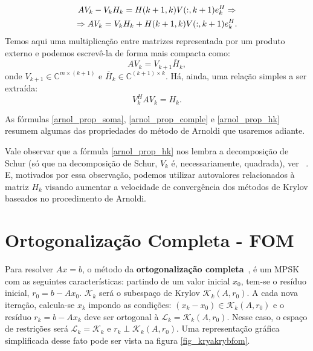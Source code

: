 \begin{gather}
AV_k-V_kH_k=H(k+1,k)V(:,k+1)e_k^H \Rightarrow \notag\\ \Rightarrow AV_k=V_kH_k+H(k+1,k)V(:,k+1)e_k^H\label{arnol_prop_soma}.
\end{gather}
Temos aqui uma multiplicação entre matrizes representada por um produto externo e podemos escrevê-la de forma mais compacta como:
\begin{equation}\label{arnol_prop_comple}
AV_k=V_{k+1}\overline{H}_k,
\end{equation}
onde $V_{k+1}\in\mathbb{C}^{m\times (k+1)}$ e $\overline{H}_k\in\mathbb{C}^{(k+1)\times k}$.
Há, ainda, uma relação simples a ser extraída:
\begin{equation}\label{arnol_prop_hk}
V_k^HAV_k={H}_k.
\end{equation}



 As fórmulas \eqref{arnol_prop_soma}, \eqref{arnol_prop_comple} e \eqref{arnol_prop_hk} resumem algumas das propriedades do método de Arnoldi que usaremos adiante.

 \begin{obs}\label{arnol_obs_vkavk}
 Vale observar que a fórmula \eqref{arnol_prop_hk} nos lembra  a decomposição de Schur (só que na decomposição de Schur, $V_k$ é, necessariamente, quadrada), ver ~\cite[pág. 79]{HornJohnson1985}. E, motivados por essa observação, podemos utilizar autovalores relacionados à matriz ${H}_k$ visando aumentar a velocidade de convergência dos  métodos de Krylov baseados no procedimento de Arnoldi.
 \end{obs}

\section{Ortogonalização Completa - FOM}\label{arnol_sec_fom}

Para resolver $Ax=b$, o método da \textbf{ortogonalização completa}~\cite{Saad1981Krylov}, \cite{Saad03Iterative} é um MPSK com as seguintes características:  partindo de um valor inicial $x_0$, tem-se o  resíduo inicial, $r_0=b-Ax_0$. $\mathcal{K}_k$ será o subespaço de Krylov $\mathcal{K}_k(A,r_0)$. A cada nova iteração, calcula-se $x_k$  impondo as condições: $(x_k-x_0)\in \mathcal{K}_k(A,r_0)$ e o  resíduo $r_k=b-Ax_k$ deve ser ortogonal à $\mathcal{L}_k=\mathcal{K}_k(A,r_0)$. Nesse caso, o espaço de restrições será $\mathcal{L}_k=\mathcal{K}_k$ e $r_k\perp \mathcal{K}_k(A,r_0)$. Uma representação gráfica simplificada desse fato pode ser vista na figura \ref{fig_kryakrybfom}.

